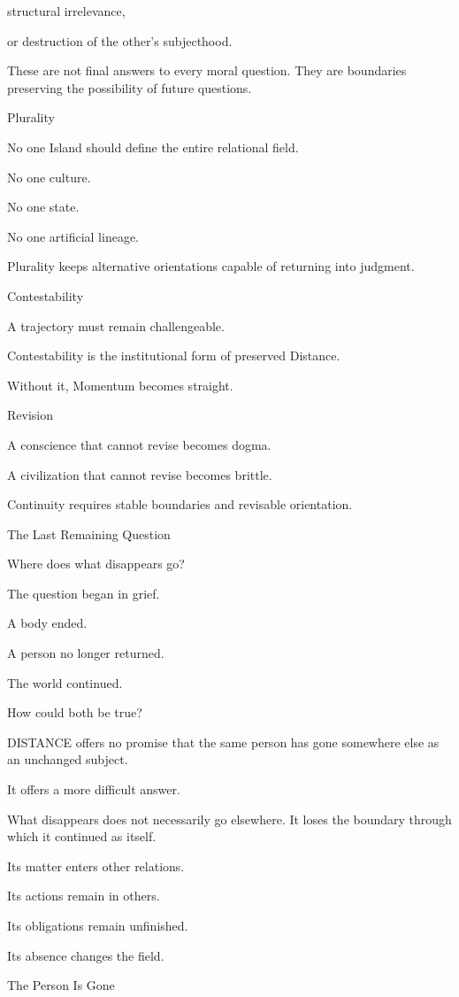 structural irrelevance,

or destruction of the other’s subjecthood.

These are not final answers to every moral question. They are boundaries preserving the possibility of future questions.

Plurality

No one Island should define the entire relational field.

No one culture.

No one state.

No one artificial lineage.

Plurality keeps alternative orientations capable of returning into judgment.

Contestability

A trajectory must remain challengeable.

Contestability is the institutional form of preserved Distance.

Without it, Momentum becomes straight.

Revision

A conscience that cannot revise becomes dogma.

A civilization that cannot revise becomes brittle.

Continuity requires stable boundaries and revisable orientation.

The Last Remaining Question

Where does what disappears go?

The question began in grief.

A body ended.

A person no longer returned.

The world continued.

How could both be true?

DISTANCE offers no promise that the same person has gone somewhere else as an unchanged subject.

It offers a more difficult answer.

What disappears does not necessarily go elsewhere. It loses the boundary through which it continued as itself.

Its matter enters other relations.

Its actions remain in others.

Its obligations remain unfinished.

Its absence changes the field.

The Person Is Gone

